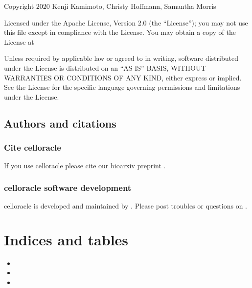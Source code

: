 \documentclass[letterpaper,10pt,english]{sphinxmanual}
\begin{document}
Copyright 2020 Kenji Kamimoto, Christy Hoffmann, Samantha Morris

Licensed under the Apache License, Version 2.0 (the “License”);
you may not use this file except in compliance with the License.
You may obtain a copy of the License at


Unless required by applicable law or agreed to in writing, software
distributed under the License is distributed on an “AS IS” BASIS,
WITHOUT WARRANTIES OR CONDITIONS OF ANY KIND, either express or implied.
See the License for the specific language governing permissions and
limitations under the License.


\section{Authors and citations}
\label{\detokenize{citation/index:authors-and-citations}}\label{\detokenize{citation/index:citing}}\label{\detokenize{citation/index::doc}}

\subsection{Cite celloracle}
\label{\detokenize{citation/index:cite-celloracle}}
If you use celloracle please cite our bioarxiv preprint .


\subsection{celloracle software development}
\label{\detokenize{citation/index:celloracle-software-development}}
celloracle is developed and maintained by .
Please post troubles or questions on .


\chapter{Indices and tables}
\label{\detokenize{index:indices-and-tables}}\begin{itemize}
\item {} 

\item {} 

\item {} 

\end{itemize}
\end{document}
